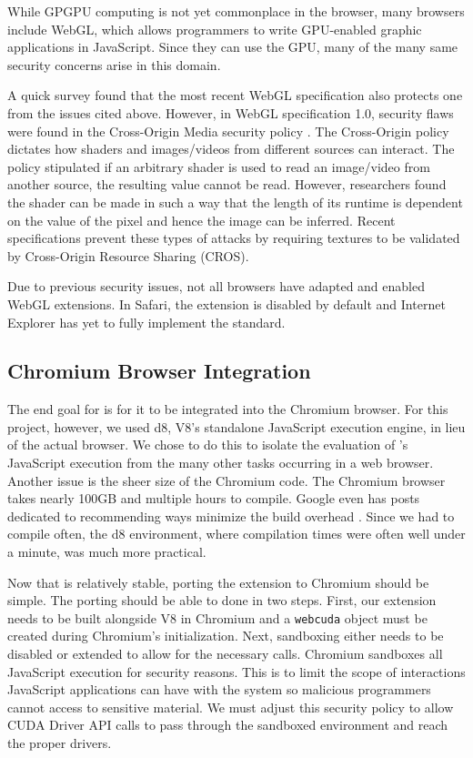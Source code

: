 While GPGPU computing is not yet commonplace in the browser, many browsers include
WebGL, which allows programmers to write GPU-enabled graphic applications in
JavaScript. Since they can use the GPU, many of the many same security concerns
arise in this domain. 

A quick survey found that the most recent WebGL specification also protects one
from the issues cited above.  However, in WebGL specification 1.0, security
flaws were found in the Cross-Origin Media security policy \cite{webGLerror1,
webGLerror2}. The Cross-Origin policy dictates how shaders and images/videos
from different sources can interact. The policy stipulated if an arbitrary
shader is used to read an image/video from another source, the resulting value
cannot be read.  However, researchers found the shader can be made in such a way
that the length of its runtime is dependent on the value of the pixel and hence
the image can be inferred. Recent specifications prevent these types of attacks
by requiring textures to be validated by Cross-Origin Resource Sharing (CROS).

Due to previous security issues, not all browsers have adapted and enabled WebGL
extensions. In Safari, the extension is disabled by default and Internet
Explorer has yet to fully implement the standard.

\subsection{Chromium Browser Integration} 
\label{chromeIntegration}
The end goal for \name is for it to be integrated into the
Chromium browser. For this project, however, we used d8, V8's standalone
JavaScript execution engine, in lieu of the actual browser. We chose to do this
to isolate the evaluation of \namens's JavaScript execution from the many other
tasks occurring in a web browser.  Another issue is the sheer size of the Chromium code.
The Chromium browser takes nearly 100GB and multiple hours to compile. Google
even has 
posts dedicated to recommending ways minimize the build overhead
\cite{linuxfasterbuilds}.  Since we had to compile often, the d8 environment,
where compilation times were often well under a minute, was much more practical.

Now that \name is relatively stable, porting the extension to Chromium should be
simple. The porting should be able to done in two steps. First, our extension
needs to be built alongside V8 in Chromium and a \texttt{webcuda} object must be
created during Chromium's initialization.  Next, sandboxing either needs to be
disabled or extended to allow for the necessary \name calls. Chromium sandboxes
all JavaScript execution for security reasons. This is to limit the scope of
interactions JavaScript applications can have with the system so malicious
programmers cannot access to sensitive material. We must adjust this security
policy to allow CUDA Driver API calls to pass through the sandboxed environment
and reach the proper drivers. 


